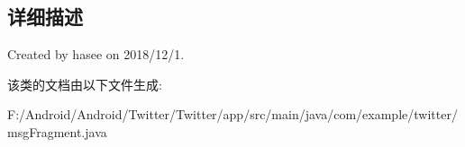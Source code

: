 \subsection{详细描述}
Created by hasee on 2018/12/1. 

该类的文档由以下文件生成\+:\begin{DoxyCompactItemize}
\item 
F\+:/\+Android/\+Android/\+Twitter/\+Twitter/app/src/main/java/com/example/twitter/msg\+Fragment.\+java\end{DoxyCompactItemize}
